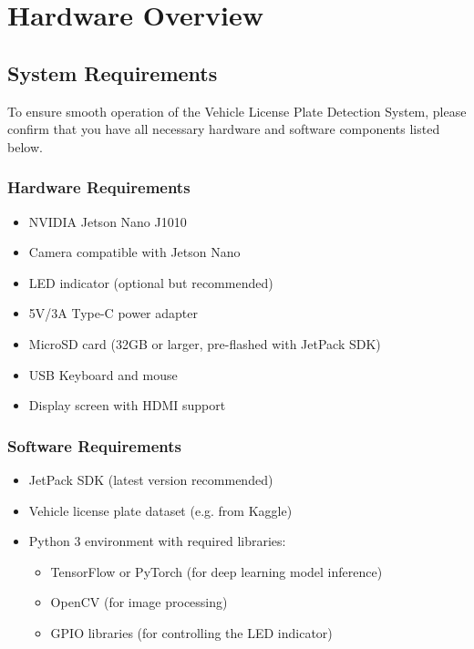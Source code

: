 %
%

\chapter{Hardware Overview}


\section{System Requirements}
To ensure smooth operation of the Vehicle License Plate Detection System, please confirm that you have all necessary hardware and software components listed below.

\subsection*{Hardware Requirements}
\begin{itemize}[label=--, left=1.5em]
	\item NVIDIA Jetson Nano J1010
	\item Camera compatible with Jetson Nano
	\item LED indicator (optional but recommended)
	\item 5V/3A Type-C power adapter
	\item MicroSD card (32GB or larger, pre-flashed with JetPack SDK)
	\item USB Keyboard and mouse
	\item Display screen with HDMI support
\end{itemize}

\subsection*{Software Requirements}
\begin{itemize}[label=--, left=1.5em]
	\item JetPack SDK (latest version recommended)
	\item Vehicle license plate dataset (e.g. from Kaggle)
	\item Python 3 environment with required libraries:
	\begin{itemize}[label=$\bullet$, left=2.5em]
		\item TensorFlow or PyTorch (for deep learning model inference)
		\item OpenCV (for image processing)
		\item GPIO libraries (for controlling the LED indicator)
	\end{itemize}
\end{itemize}




